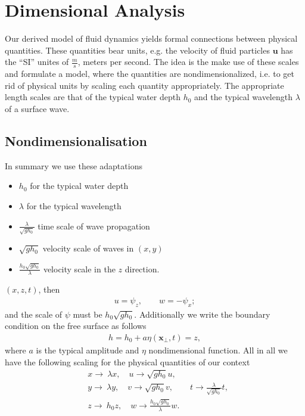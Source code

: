 \section{Dimensional Analysis}
Our derived model of fluid dynamics yields formal connections between
physical quantities. These quantities bear units, e.g. the velocity of fluid
particles $\mathbf{u}$ has the ``SI'' unites of $\frac{m}{s}$, meters per
second. The idea is the make use of these scales and formulate a model, where
the quantities are nondimensionalized, i.e. to get rid of physical units by
scaling each quantity appropriately. The appropriate length scales are that
of the typical water depth $h_0$ and the typical wavelength $\lambda$ of a
surface wave.

\subsection{Nondimensionalisation}
In summary we use these adaptations
\begin{itemize}
    \item $h_0$ for the typical water depth
    \item $\lambda$ for the typical wavelength
    \item $\frac{\lambda}{\sqrt{g h_0}}$ time scale of wave propagation
    \item $\sqrt{g h_0}$ velocity scale of waves in $(x, y)$
    \item $\frac{h_0 \sqrt{g h_0} }{\lambda}$ velocity scale in the $z$
        direction.
\end{itemize}
$(x, z, t)$, then
\begin{align}
    u = \psi _z, \qquad w = - \psi_x;
\end{align}
and the scale of $\psi$ must be $h_0\sqrt{g h_0}$. Additionally we write the
boundary condition on the free surface as follows
\begin{align}
    h  = h_0 + a \eta (\mathbf{x}_\perp, t) = z,
\end{align}
where $a$ is the typical amplitude and $\eta$ nondimensional function. All in
all we have the following scaling for the physical quantities of our context
\begin{align}
    &x \rightarrow\ \lambda x, \quad u \rightarrow \sqrt{gh_0} u, \\
      &y \rightarrow\ \lambda y, \quad v \rightarrow \sqrt{gh_0} v, \qquad
      t\rightarrow \frac{\lambda}{\sqrt{gh_0}}t,\\
      &z \rightarrow\ h_0 z, \quad w \rightarrow
    \frac{h_0\sqrt{gh_0}}{\lambda} w.
\end{align}
